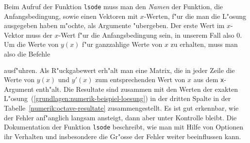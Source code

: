 Beim Aufruf der Funktion \texttt{lsode} muss man den {\em Namen}
der Funktion, die Anfangsbedingung, sowie einen Vektoren mit $x$-Werten,
f"ur die man die L"osung ausgegeben haben m"ochte, als Argumente
"ubergeben.
Der erste Wert im $x$-Vektor muss der $x$-Wert f"ur die Anfangsbedingung
sein, in unserem Fall also $0$.
Um die Werte von $y(x)$ f"ur ganzzahlige Werte von $x$ zu erhalten,
muss man also die Befehle

ausf"uhren.
Als R"uckgabewert erh"alt man eine Matrix, die in jeder Zeile die
Werte von $y(x)$ und $y'(x)$ zum entsprechenden Wert von $x$
aus dem \texttt{x}-Argument enth"alt.
Die Resultate sind zusammen mit den Werten der exakten
L"osung~(\ref{grundlagen:numerik-beispiel-loesung}) in der dritten Spalte 
in der Tabelle~\ref{numerik:octave-resultate} zusammengestellt.
Es ist gut erkennbar, wie der Fehler anf"anglich langsam ansteigt,
dann aber unter Kontrolle bleibt.
Die Dokumentation der Funktion \texttt{lsode} beschreibt, wie man mit
Hilfe von Optionen ihr Verhalten und insbesondere die Gr"osse der
Fehler weiter beeinflussen kann.
